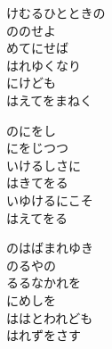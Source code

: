 \documentclass[10pt,b5j]{tarticle} %
\begin{document}
\begin{enumerate} %
    \begin{minipage}[c]{\blocksize}
        
        \vspace{\linespace}
        \item
        けむるひとときの\\
        ののせよ\\
        めてにせば\\
        はれゆくなり\\
        にけども\\
        はえてをまねく
        
    \end{minipage}
    \begin{minipage}[c]{\blocksize}
        
        \vspace{\linespace}
        \item
        のにをし\\
        にをじつつ\\
        いけるしさに\\
        はきてをる\\
        いゆけるにこそ\\
        はえてをる
        
    \end{minipage}
    \begin{minipage}[c]{\blocksize}

        \vspace{\linespace}
        \item
        のはばまれゆき\\
        のるやの\\
        るるなかれを\\
        にめしを\\
        ははとわれども\\
        はれずをさす
    
    \end{minipage}
\end{enumerate} %
\end{document}
